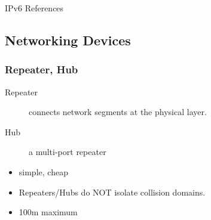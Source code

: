 

\begin{frame}{IPv6 References}
  \begin{refsection}
    \nocite{wiki:ipv6, wiki:ipv6pkt, wiki:ipv6addr, rfc2460, rfc4291}
    \printbibliography[heading=none]
  \end{refsection}
\end{frame}

\subsection{Networking Devices}

\begin{frame}
  \begin{center}
  \end{center}
\end{frame}

\subsubsection{Repeater, Hub}

\begin{frame}
  \begin{description}
  \item[Repeater] connects network segments at the physical layer.
  \item[Hub] a multi-port repeater 
  \end{description}
  \begin{itemize}
  \item simple, cheap
  \item Repeaters/Hubs do NOT isolate collision domains.
  \item 100m maximum
  \end{itemize}    
\end{frame}

